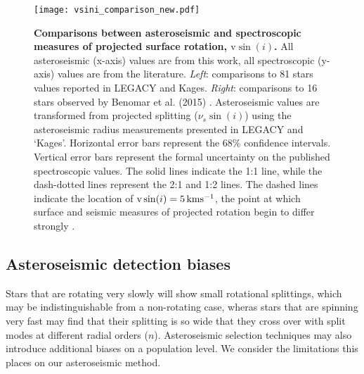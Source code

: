 \begin{figure}[h!]
	\centering
	\texttt{[image: vsini\_comparison\_new.pdf]}
	\caption{\textbf{Comparisons between asteroseismic and spectroscopic measures of projected surface rotation, $\textrm{v}\sin(i)$.} All asteroseismic (x-axis) values are from this work, all spectroscopic (y-axis) values are from the literature. \textit{Left}: comparisons to 81 stars values reported in LEGACY and Kages. \textit{Right}: comparisons to 16 stars observed by Benomar et al. (2015) \cite{benomar+2015}. Asteroseismic values are transformed from projected splitting ($\nu_s\sin(i)$) using the asteroseismic radius measurements presented in LEGACY and `Kages'. Horizontal error bars represent the 68\% confidence intervals. Vertical error bars represent the formal uncertainty on the published spectroscopic values. The solid lines indicate the 1:1 line, while the dash-dotted lines represent the 2:1 and 1:2 lines. The dashed lines indicate the location of $\textrm{v}\sin(i) = 5\, \rm{kms^{-1}}$, the point at which surface and seismic measures of projected rotation begin to differ strongly \cite{tayar+2015}.}
	\label{fig:vsinilit}
\end{figure}


\subsection{Asteroseismic detection biases}

Stars that are rotating very slowly will show small rotational splittings, which may be indistinguishable from a non-rotating case, wheras stars that are spinning very fast may find that their splitting is so wide that they cross over with split modes at different radial orders ($n$). Asteroseismic selection techniques may also introduce additional biases on a population level. We consider the limitations this places on our asteroseismic method.

